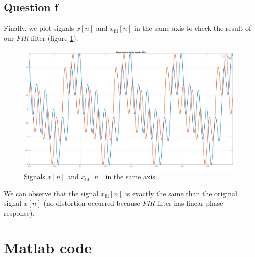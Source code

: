 \documentclass[a4paper, 12pt]{article}
\begin{document}
	\subsection*{Question f}
	Finally, we plot signals $x[n]$ and $x_\text{fil}[n]$ in the same axis to check the result of our \emph{FIR} filter (figure \ref{fig:question_f}).
	\begin{figure}[H]
	    \centering
	    \includegraphics[width=\textwidth]{resources/pdf/question_f.pdf}
	    \caption{Signals $x[n]$ and $x_\text{fil}[n]$ in the same axis.}
	    \label{fig:question_f}
	\end{figure}
	We can observe that the signal $x_\text{fil}[n]$ is exactly the same than the original signal $x[n]$ (no distortion occurred because \emph{FIR} filter has linear phase response).
	\newpage
	\appendix
	\section*{Matlab code}
	
\end{document}
